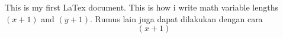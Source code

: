 \documentclass[11pt]{article}
\begin{document}
	This is my first LaTex document.
	This is how i write math variable
	lengths $(x+1)$ and $(y+1)$. 
	Rumus lain juga dapat dilakukan dengan cara $$(x+1)$$
\end{document}
